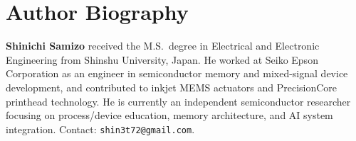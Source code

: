 \documentclass[conference]{IEEEtran}
\begin{document}
\section*{Author Biography}
\textbf{Shinichi Samizo} received the M.S.\ degree in Electrical and Electronic Engineering from Shinshu University, Japan. He worked at Seiko Epson Corporation as an engineer in semiconductor memory and mixed-signal device development, and contributed to inkjet MEMS actuators and PrecisionCore printhead technology. He is currently an independent semiconductor researcher focusing on process/device education, memory architecture, and AI system integration. Contact: \texttt{shin3t72@gmail.com}.
\end{document}
